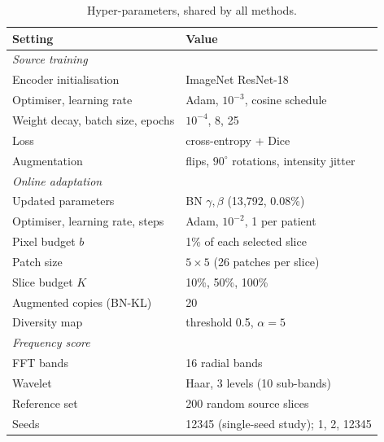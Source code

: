 \documentclass[a4paper,fleqn]{cas-dc}
\begin{document}
\begin{table}[!htbp]
\caption{Hyper-parameters, shared by all methods.}
\label{tab:hyper}
\centering\footnotesize
\begin{tabular}{@{}p{}p{}@{}}
\toprule
Setting & Value \\
\midrule
\multicolumn{2}{l}{\emph{Source training}} \\
Encoder initialisation & ImageNet ResNet-18 \\
Optimiser, learning rate & Adam, $10^{-3}$, cosine schedule \\
Weight decay, batch size, epochs & $10^{-4}$, 8, 25 \\
Loss & cross-entropy + Dice \\
Augmentation & flips, $90^\circ$ rotations, intensity jitter \\
\multicolumn{2}{l}{\emph{Online adaptation}} \\
Updated parameters & BN $\gamma,\beta$ (13{,}792, 0.08\%) \\
Optimiser, learning rate, steps & Adam, $10^{-2}$, 1 per patient \\
Pixel budget $b$ & 1\% of each selected slice \\
Patch size & $5\times5$ (26 patches per slice) \\
Slice budget $K$ & 10\%, 50\%, 100\% \\
Augmented copies (BN-KL) & 20 \\
Diversity map & threshold 0.5, $\alpha=5$ \\
\multicolumn{2}{l}{\emph{Frequency score}} \\
FFT bands & 16 radial bands \\
Wavelet & Haar, 3 levels (10 sub-bands) \\
Reference set & 200 random source slices \\
Seeds & 12345 (single-seed study); 1, 2, 12345 \\
\bottomrule
\end{tabular}
\end{table}
\end{document}
